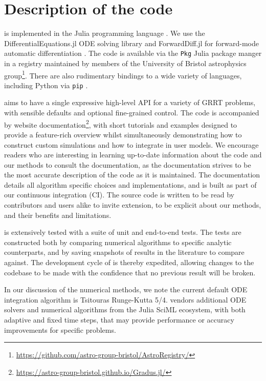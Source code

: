 \section{Description of the code}

\Gradus is implemented in the Julia programming language \citep{Bezanson_Julia_A_fresh_2017}. We use the DifferentialEquations.jl ODE solving library and ForwardDiff.jl for forward-mode automatic differentiation \citep{RevelsLubinPapamarkou2016}. The code is available via the \texttt{Pkg} Julia package manger in a registry maintained by members of the University of Bristol astrophysics group\footnote{\url{https://github.com/astro-group-bristol/AstroRegistry/}}. There are also rudimentary bindings to a wide variety of languages, including Python via \texttt{pip} \citep{}.

\Gradus aims to have a single expressive high-level API for a variety of GRRT problems, with sensible defaults and optional fine-grained control. The code is accompanied by website documentation\footnote{\url{https://astro-group-bristol.github.io/Gradus.jl/}}, with short tutorials and examples designed to provide a feature-rich overview whilst simultaneously demonstrating how to construct custom simulations and how to integrate \Gradus in user models. We encourage readers who are interesting in learning up-to-date information about the code and our methods to consult the documentation, as the documentation strives to be the most accurate description of the code as it is maintained. The documentation details all algorithm specific choices and implementations, and is built as part of our continuous integration (CI). The source code is written to be read by contributors and users alike to invite extension, to be explicit about our methods, and their benefits and limitations.

\Gradus is extensively tested with a suite of unit and end-to-end tests. The tests are constructed both by comparing numerical algorithms to specific analytic counterparts, and by saving snapshots of results in the literature to compare against. The development cycle of \Gradus is thereby expedited, allowing changes to the codebase to be made with the confidence that no previous result will be broken.

In our discussion of the numerical methods, we note the current default ODE integration algorithm is Tsitouras Runge-Kutta 5/4. \Gradus vendors additional ODE solvers and numerical algorithms from the Julia SciML ecosystem, with both adaptive and fixed time steps, that may provide performance or accuracy improvements for specific problems.

